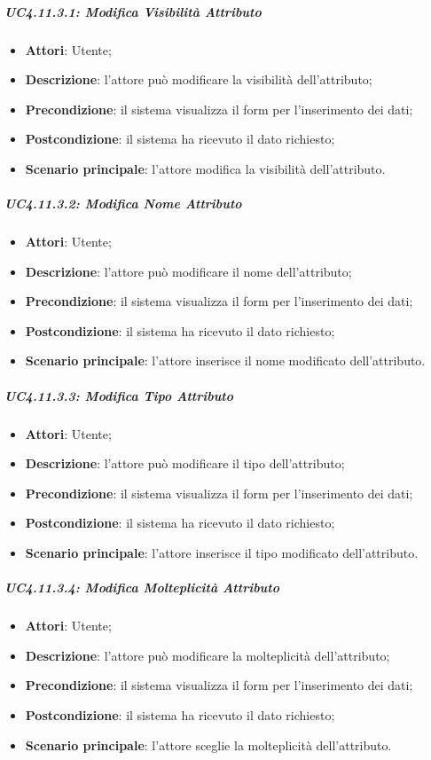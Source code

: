 \begin{itemize}
\begin{itemize}
\begin{itemize}
\begin{itemize}
\subparagraph{UC4.11.3.1: Modifica Visibilità Attributo}
\label{UC4.11.3.1}
\begin{itemize}
	\item \textbf{Attori}: Utente;
	\item \textbf{Descrizione}: l'attore può modificare la visibilità dell'attributo;
	\item \textbf{Precondizione}: il sistema visualizza il form per l'inserimento dei dati;
	\item \textbf{Postcondizione}: il sistema ha ricevuto il dato richiesto;
	\item \textbf{Scenario principale}: l'attore modifica la visibilità dell'attributo.
\end{itemize}

\subparagraph{UC4.11.3.2: Modifica Nome Attributo}
\label{UC4.11.3.2}
\begin{itemize}
	\item \textbf{Attori}: Utente;
	\item \textbf{Descrizione}: l'attore può modificare il nome dell'attributo;
	\item \textbf{Precondizione}: il sistema visualizza il form per l'inserimento dei dati;
	\item \textbf{Postcondizione}: il sistema ha ricevuto il dato richiesto;
	\item \textbf{Scenario principale}: l'attore inserisce il nome modificato dell'attributo.
\end{itemize}

\subparagraph{UC4.11.3.3: Modifica Tipo Attributo}
\label{UC4.11.3.3}
\begin{itemize}
	\item \textbf{Attori}: Utente;
	\item \textbf{Descrizione}: l'attore può modificare il tipo dell'attributo;
	\item \textbf{Precondizione}: il sistema visualizza il form per l'inserimento dei dati;
	\item \textbf{Postcondizione}: il sistema ha ricevuto il dato richiesto;
	\item \textbf{Scenario principale}: l'attore inserisce il tipo modificato dell'attributo.
\end{itemize}

\subparagraph{UC4.11.3.4: Modifica Molteplicità Attributo}
\label{UC4.11.3.4}
\begin{itemize}
	\item \textbf{Attori}: Utente;
	\item \textbf{Descrizione}: l'attore può modificare la molteplicità dell'attributo;
	\item \textbf{Precondizione}: il sistema visualizza il form per l'inserimento dei dati;
	\item \textbf{Postcondizione}: il sistema ha ricevuto il dato richiesto;
	\item \textbf{Scenario principale}: l'attore sceglie la molteplicità dell'attributo.
\end{itemize}


\end{itemize}
\end{itemize}
\end{itemize}
\end{itemize}
